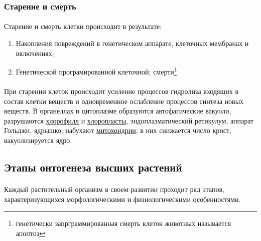 \paragraph*{}

\subsubsection*{Старение и смерть}

\paragraph*{}Старение и смерть клетки происходит в результате:

\begin{enumerate}
\item Накопления повреждений в генетическом аппарате, клеточных мембранах и включениях;
\item Генетической програмированной клеточной; смерти\footnote{генетически запрграммированная смерть клеток животных называется апоптоз}
\end{enumerate}

\paragraph*{}При старении клеток происходит усиление процессов гидролиза входящих в состав клетки веществ и одновременное ослабление процессов синтеза новых веществ. В органеллах и цитоплазме образуются автофагические вакуоли, разрушаются \hyperlink{sect_hlorophilus}{хлорофилл} и \hyperlink{cell_plastids}{хлоропласты}, эндоплазматический ретикулум, аппарат Гольджи, ядрышко, набухают \hyperlink{mitohondria}{митохондрии}, в них снижается число крист, вакуолизируется ядро. 


\subsection*{Этапы онтогенеза высших растений} 

\paragraph*{}Каждый растительный организм в своем \hypertarget{plant_ontogenesis}{развитии} проходит ряд этапов, характеризующихся морфологическими и физиологическими особенностями.

